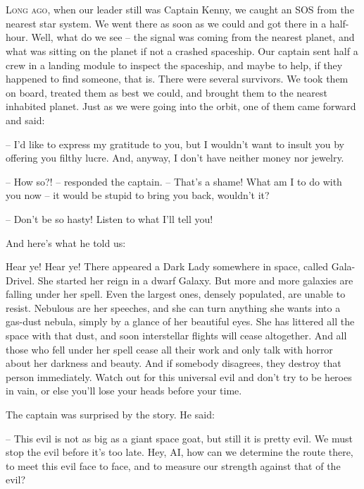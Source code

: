 \documentclass[ebook,twoside,final,openright]{memoir}
\begin{document}
\chapter{}
\par
\lettrine{L}{ong ago,} when our leader still was Captain Kenny, we caught an SOS from the nearest star system. We went there as soon as we could and got there in a half-hour. Well, what do we see – the signal was coming from the nearest planet, and what was sitting on the planet if not a crashed spaceship. Our captain sent half a crew in a landing module to inspect the spaceship, and maybe to help, if they happened to find someone, that is. There were several survivors. We took them on board, treated them as best we could, and brought them to the nearest inhabited planet. Just as we were going into the orbit, one of them came forward and said: \par
\par
– I'd like to express my gratitude to you, but I wouldn’t want to insult you by offering you filthy lucre. And, anyway, I don’t have neither money nor jewelry.\par
– How so?! – responded the captain. – That's a shame! What am I to do with you now – it would be stupid to bring you back, wouldn’t it? \par
– Don’t be so hasty! Listen to what I’ll tell you! \par
 And here’s what he told us:\par
\par
Hear ye! Hear ye! There appeared a Dark Lady somewhere in space, called Gala-Drivel. She started her reign in a dwarf Galaxy. But more and more galaxies are falling under her spell. Even the largest ones, densely populated, are unable to resist. Nebulous are her speeches, and she can turn anything she wants into a gas-dust nebula, simply by a glance of her beautiful eyes. She has littered all the space with that dust, and soon interstellar flights will cease altogether. And all those who fell under her spell cease all their work and only talk with horror about her darkness and beauty. And if somebody disagrees, they destroy that person immediately. Watch out for this universal evil and don’t try to be heroes in vain, or else you’ll lose your heads before your time.\par
\par
The captain was surprised by the story. He said:\par
– This evil is not as big as a giant space goat, but still it is pretty evil. We must stop the evil before it’s too late. Hey, AI, how can we determine the route there, to meet this evil face to face, and to measure our strength against that of the evil?\par
\end{document}
